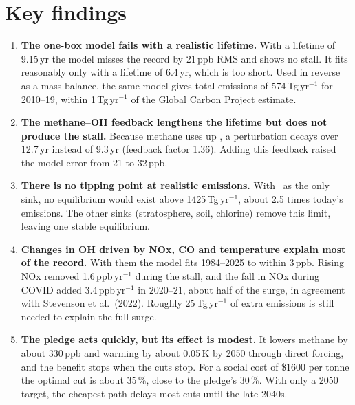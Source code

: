 \documentclass[11pt,a4paper]{article}
\newcommand{\OH}{\ce{OH}}
\begin{document}
\section{Key findings}
\begin{enumerate}\itemsep2pt
\item \textbf{The one-box model fails with a realistic lifetime.} With a lifetime of 9.15\,yr the model misses the record by 21\,ppb RMS and shows no stall. It fits reasonably only with a lifetime of 6.4\,yr, which is too short. Used in reverse as a mass balance, the same model gives total emissions of 574\,Tg\,yr$^{-1}$ for 2010--19, within 1\,Tg\,yr$^{-1}$ of the Global Carbon Project estimate.
\item \textbf{The methane--OH feedback lengthens the lifetime but does not produce the stall.} Because methane uses up \OH, a perturbation decays over 12.7\,yr instead of 9.3\,yr (feedback factor 1.36). Adding this feedback raised the model error from 21 to 32\,ppb.
\item \textbf{There is no tipping point at realistic emissions.} With \OH\ as the only sink, no equilibrium would exist above 1425\,Tg\,yr$^{-1}$, about 2.5 times today's emissions. The other sinks (stratosphere, soil, chlorine) remove this limit, leaving one stable equilibrium.
\item \textbf{Changes in OH driven by NOx, CO and temperature explain most of the record.} With them the model fits 1984--2025 to within 3\,ppb. Rising NOx removed 1.6\,ppb\,yr$^{-1}$ during the stall, and the fall in NOx during COVID added 3.4\,ppb\,yr$^{-1}$ in 2020--21, about half of the surge, in agreement with Stevenson et al.\ (2022). Roughly 25\,Tg\,yr$^{-1}$ of extra emissions is still needed to explain the full surge.
\item \textbf{The pledge acts quickly, but its effect is modest.} It lowers methane by about 330\,ppb and warming by about 0.05\,K by 2050 through direct forcing, and the benefit stops when the cuts stop. For a social cost of \$1600 per tonne the optimal cut is about 35\,\%, close to the pledge's 30\,\%. With only a 2050 target, the cheapest path delays most cuts until the late 2040s.
\end{enumerate}
\end{document}
